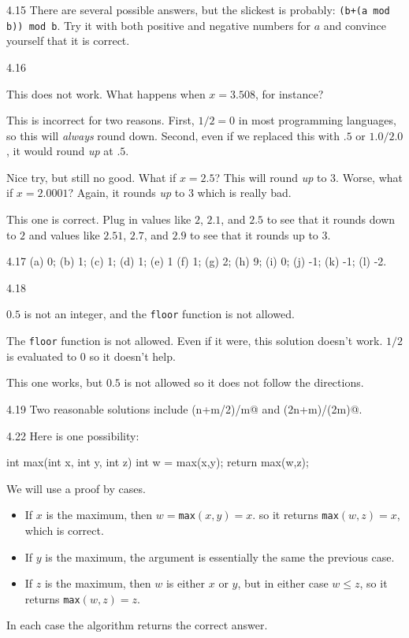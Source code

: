 \begin{Answer}{4.15}
There are several possible answers, but the slickest is probably:
\verb#(b+(a mod b)) mod b#.  Try it with both positive and negative
numbers for $a$ and convince yourself that it is correct.
\end{Answer}
\begin{Answer}{4.16}
\begin{solevalenum}
\item
This does not work.  What happens when $x=3.508$, for instance?
\item
This is incorrect for two reasons.  First, $1/2=0$ in most programming languages, so this
will {\em always} round down.
Second, even if we replaced this with $.5$ or $1.0/2.0$, it would round {\em up} at $.5$.
\item
Nice try, but still no good.  What if $x=2.5$?  This will round {\em up} to $3$.
Worse, what if $x=2.0001$?  Again, it rounds {\em up} to $3$ which is really bad.
\item
This one is correct.  Plug in values like $2$, $2.1$, and $2.5$ to see that it rounds down to
$2$ and values like $2.51$, $2.7$, and $2.9$ to see that it rounds up to $3$.
\end{solevalenum}
\end{Answer}
\begin{Answer}{4.17}
(a) 0; (b) 1; (c) 1; (d) 1; (e) 1 (f) 1; (g) 2; (h) 9; (i) 0; (j) -1; (k) -1; (l) -2.
\end{Answer}
\begin{Answer}{4.18}
\begin{solevalenum}
\item
$0.5$ is not an integer, and the \verb+floor+ function is not allowed.
\item
The \verb+floor+ function is not allowed.  Even if it were, this solution
doesn't work. $1/2$ is evaluated to $0$ so it doesn't help.
\item
This one works, but $0.5$ is not allowed so it does not follow the directions.
\end{solevalenum}
\end{Answer}
\begin{Answer}{4.19}
Two reasonable solutions include \verb@(n+m/2)/m@ and \verb@(2n+m)/(2m)@.
\end{Answer}
\begin{Answer}{4.22}
Here is one possibility:
\begin{code}
    int max(int x, int y, int z) {
        int w = max(x,y);
        return max(w,z);
    }
\end{code}
We will use a proof by cases.
\begin{itemize}
\item
If $x$ is the maximum, then $w=$\verb+max+$(x,y) = x$.
so it returns \verb+max+$(w,z)=x$, which is correct.
\item
If $y$ is the maximum, the argument is essentially the same the previous case.
\item
If $z$ is the maximum, then $w$ is either $x$ or $y$, but in either case $w\leq z$,
so it returns \verb+max+$(w,z)=z$.
\end{itemize}
In each case the algorithm returns the correct answer.
\end{Answer}
